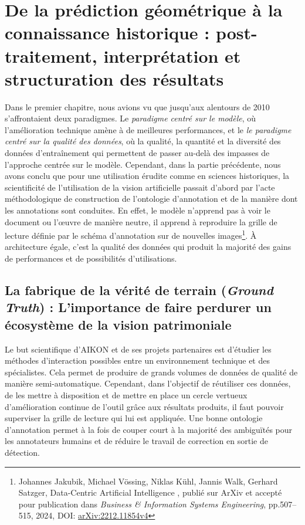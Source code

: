 \section[De la prédiction à la connaissance]{De la prédiction géométrique à la connaissance historique : post-traitement, interprétation et structuration des résultats}

Dans le premier chapitre, nous avions vu que jusqu'aux alentours de 2010 s'affrontaient deux paradigmes. Le \textit{paradigme centré sur le modèle}, où l'amélioration technique amène à de meilleures performances, et le \textit{le paradigme centré sur la qualité des données}, où la qualité, la quantité et la diversité des données d'entraînement qui permettent de passer au-delà des impasses de l'approche centrée sur le modèle. Cependant, dans la partie précédente, nous avons conclu que pour une utilisation érudite comme en sciences historiques, la scientificité de l'utilisation de la vision artificielle passait d'abord par l'acte méthodologique de construction de l'ontologie d'annotation et de la manière dont les annotations sont conduites. En effet, le modèle n'apprend pas à \og voir \fg le document ou l'œuvre de manière neutre, il apprend à reproduire la grille de lecture définie par le schéma d'annotation sur de nouvelles images\footnote{Johannes Jakubik, Michael Vössing, Niklas Kühl, Jannis Walk, Gerhard Satzger, \og Data-Centric Artificial Intelligence \fg, publié sur ArXiv et accepté pour publication dans \textit{Business \& Information Systems Engineering}, pp.507–515, 2024, DOI: \href{https://arxiv.org/abs/2212.11854v4}{arXiv:2212.11854v4}}. À architecture égale, c'est la qualité des données qui produit la majorité des gains de performances et de possibilités d'utilisations. 

\subsection[La fabrique de la vérité de terrain]{La fabrique de la vérité de terrain (\textit{Ground Truth}) : L'importance de faire perdurer un écosystème de la vision patrimoniale}

Le but scientifique d'AIKON et de ses projets partenaires est d'étudier les méthodes d'interaction possibles entre un environnement technique et des spécialistes. Cela permet de produire de grands volumes de données de qualité de manière semi-automatique. Cependant, dans l'objectif de réutiliser ces données, de les mettre à disposition et de mettre en place un cercle vertueux d'amélioration continue de l'outil grâce aux résultats produits, il faut pouvoir superviser la grille de lecture qui lui est appliquée. Une bonne ontologie d'annotation permet à la fois de couper court à la majorité des ambiguïtés pour les annotateurs humains et de réduire le travail de correction en sortie de détection.

